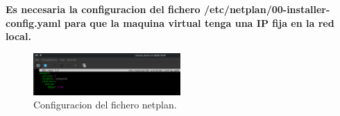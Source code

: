 \documentclass[a4paper,12pt]{article}
\begin{document}
\begin{itemize}
    \newpage

    \textbf{Es necesaria la configuracion del fichero /etc/netplan/00-installer-config.yaml para que la maquina virtual tenga una IP fija en la red local.}

    \begin{figure}[h!]
        \centering
        \includegraphics[width=0.5\textwidth]{14.png}
        \caption{Configuracion del fichero netplan.}
    \end{figure}


    \end{itemize}
\end{document}
